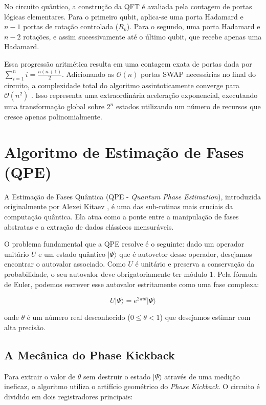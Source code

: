 \documentclass[12pt, a4paper]{article}
\newcommand{\ket}[1]{\lvert #1 \rangle}
\begin{document}
No circuito quântico, a construção da QFT é avaliada pela contagem de portas lógicas elementares. Para o primeiro qubit, aplica-se uma porta Hadamard e $n - 1$ portas de rotação controlada ($R_k$). Para o segundo, uma porta Hadamard e $n-2$ rotações, e assim sucessivamente até o último qubit, que recebe apenas uma Hadamard.

Essa progressão aritmética resulta em uma contagem exata de portas dada por $\sum_{i=1}^{n} i = \frac{n(n+1)}{2}$. Adicionando as $\mathcal{O}(n)$ portas SWAP necessárias no final do circuito, a complexidade total do algoritmo assintoticamente converge para $\mathcal{O}(n^2)$ \cite{nielsen2010}. Isso representa uma extraordinária aceleração exponencial, executando uma transformação global sobre $2^n$ estados utilizando um número de recursos que cresce apenas polinomialmente.

\section{Algoritmo de Estimação de Fases (QPE)}

A Estimação de Fases Quântica (QPE - \textit{Quantum Phase Estimation}), introduzida originalmente por Alexei Kitaev \cite{kitaev1995quantum}, é uma das sub-rotinas mais cruciais da computação quântica. Ela atua como a ponte entre a manipulação de fases abstratas e a extração de dados clássicos mensuráveis.

O problema fundamental que a QPE resolve é o seguinte: dado um operador unitário $U$ e um estado quântico $\ket{\Psi}$ que é autovetor desse operador, desejamos encontrar o autovalor associado. Como $U$ é unitário e preserva a conservação da probabilidade, o seu autovalor deve obrigatoriamente ter módulo 1. Pela fórmula de Euler, podemos escrever esse autovalor estritamente como uma fase complexa:

\begin{equation}
    U\ket{\Psi} = e^{2\pi i \theta}\ket{\Psi}
\end{equation}

onde $\theta$ é um número real desconhecido ($0 \le \theta < 1$) que desejamos estimar com alta precisão.

\subsection{A Mecânica do Phase Kickback}

Para extrair o valor de $\theta$ sem destruir o estado $\ket{\Psi}$ através de uma medição ineficaz, o algoritmo utiliza o artifício geométrico do \textit{Phase Kickback}. O circuito é dividido em dois registradores principais:
\end{document}
